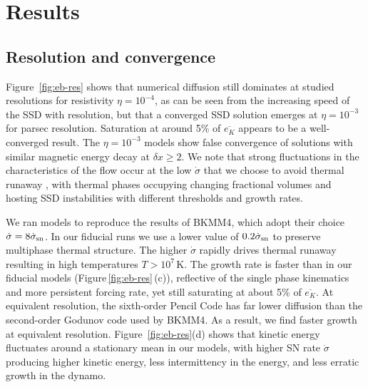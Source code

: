 \documentclass[preprint2]{aastex63}
\newcommand\SNr{\dot\sigma_{\rm sn}}
\newcommand\dx{ {\delta x}}
\newcommand\BKM{{\sf BKMM4}}
\newcommand{\fg}[1]{\textcolor{mypurple}{#1}}
\begin{document}

\section{Results} \label{sec:results}

\subsection{{Resolution and convergence}} \label{sec:conv}
{Figure~\ref{fig:eb-res} shows
 that numerical diffusion still dominates at studied
 resolutions for resistivity  $\eta = 10^{-4}$, as can be seen from the
 increasing speed of the SSD with resolution, but that a converged SSD solution
 emerges at  $\eta = 10^{-3}$ for parsec resolution.}
 Saturation at around 5\% of $\overline{e_K}$ appears to be a well-converged
 result.
 {The $\eta = 10^{-3}$ models show} false convergence
 \citep{FMA91} of solutions with similar magnetic energy decay at $\dx\geq2$.
 {We note that strong fluctuations in the characteristics of the flow
 {occur at the} low $\dot\sigma$ {that we choose to avoid thermal runaway
 \citep{LOCBN15},} with thermal phases occupying changing fractional volumes
 \citep[e.g.][]{gatto2015} and hosting SSD instabilities with different 
 thresholds and growth rates.
 }

 \fg{We ran models to reproduce the results of \BKM, which adopt their choice
 $\dot\sigma = 8\SNr$. In our fiducial runs we use a lower value of $0.2\SNr$} 
 to preserve multiphase thermal structure.
 The higher $\dot\sigma$ rapidly drives thermal runaway resulting in high
 temperatures $T>10^7$\,K.
 The growth rate is faster {than in our fiducial models} (Figure\,\ref{fig:eb-res}\,(c)), reflective of the
 single phase kinematics and more persistent forcing rate, yet {still}
 saturating at about 5\% of $\overline{e_K}$.
 {At equivalent resolution, the sixth-order Pencil Code has far lower diffusion
 than the second-order Godunov code used by \BKM. As a result, we find faster
 growth at equivalent resolution.}
\fg{
         Figure~\ref{fig:eb-res}(d) shows that kinetic energy fluctuates
         around a stationary mean in our models, with higher SN rate $\dot{\sigma}$
         producing higher kinetic energy,
 less intermittency in the energy, and less erratic growth in the
 dynamo.} 
 
\end{document}
